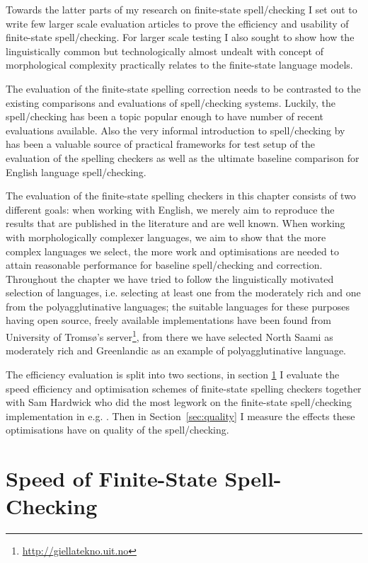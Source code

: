 \documentclass[officiallayout]{unihelcompling}
\begin{document}
Towards the latter parts of my research on finite-state spell\-/checking I set
out to write few larger scale evaluation articles to prove the efficiency and
usability of finite-state spell\-/checking. For larger scale testing I also
sought to show how the linguistically common but technologically almost undealt
with concept of morphological complexity practically relates to the
finite-state language models.

The evaluation of the finite-state spelling correction needs to be contrasted
to the existing comparisons and evaluations of spell\-/checking systems. Luckily,
the spell\-/checking has been a topic popular enough to have number of recent
evaluations available.  Also the very informal introduction to spell\-/checking
by~\citep{norvig2010howto} has been a valuable source of practical frameworks
for test setup of the evaluation of the spelling checkers as well as the
ultimate baseline comparison for English language spell\-/checking.

The evaluation of the finite-state spelling checkers in this chapter consists
of two different goals: when working with English, we merely aim to reproduce
the results that are published in the literature and are well known. When
working with morphologically complexer languages, we aim to show that the more
complex languages we select, the more work and optimisations are needed to
attain reasonable performance for baseline spell\-/checking and correction.
Throughout the chapter we have tried to follow the linguistically motivated
selection of languages, i.e. selecting at least one from the moderately rich
and one from the polyagglutinative languages; the suitable languages for these
purposes having open source, freely available implementations have been found
from University of Tromsø's server\footnote{\url{http://giellatekno.uit.no}},
from there we have selected North Saami as moderately rich and Greenlandic as
an example of polyagglutinative language.

The efficiency evaluation is split into two sections, in section
\ref{sec:speed} I evaluate the speed efficiency and optimisation schemes of
finite-state spelling checkers together with Sam Hardwick who did the
most legwork on the finite-state spell\-/checking implementation in e.g.
\citep{linden2011hfst}. Then in Section~\ref{sec:quality} I measure the
effects these optimisations have on quality of the spell\-/checking.

\section{Speed of Finite-State Spell-Checking}
\label{sec:speed}
\end{document}
